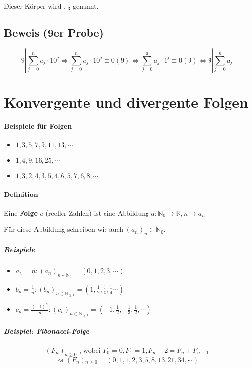 \documentclass[14pt,a4paper]{article}
\newcommand{\N}{\ensuremath{\mathbb{N}}}
\newcommand{\Nzero}{\ensuremath{\N_0}}
\begin{document}
  Dieser Körper wird $\mathbb{F}_3$ genannt.

  \subsection{Beweis (9er Probe)}
  $$ 9 | \sum_{j=0}^n a_j \cdot 10^j \Leftrightarrow \sum_{j=0}^n a_j \cdot
  10^j \equiv 0 (9) \Leftrightarrow \sum_{j=0}^n a_j \cdot 1^j \equiv 0 (9)
  \Leftrightarrow 9 | \sum_{j=0}^n a_j  $$

  \section{Konvergente und divergente Folgen}
  \paragraph{Beispiele für Folgen}
  \begin{itemize}
    \item $1,3,5,7,9,11,13, \dotsb$
    \item $1,4,9,16,25, \dotsb$
    \item $1,3,2,4,3,5,4,6,5,7,6,8, \dotsb$
  \end{itemize}

  \paragraph{Definition}
  Eine \textbf{Folge} $a$ (reeller Zahlen) ist eine Abbildung $ a : \Nzero
  \to \mathbb{R}, n \mapsto a_n $

  Für diese Abbildung schreiben wir auch $ (a_n)_n \in \Nzero$.


  \subparagraph{Beispiele}
  \begin{itemize}
    \item $a_n = n :  (a_n)_{n \in \Nzero}=(0,1,2,3,\dotsb)$
    \item $b_n = \frac{1}{n} : (b_n)_{n\in \N_{\geq 1}} = (1, \frac{1}{2},
        \frac{1}{3}, \frac{1}{4} \dotsb ) $
    \item $c_n = \frac{(-1)^n}{n} : (c_n)_{n \in \N_{\geq 1}} = (-1,
      \frac{1}{2}, -\frac{1}{3}, \frac{1}{2}, \dotsb)$
    \end{itemize}

    \subparagraph{Beispiel: Fibonacci-Folge}
    $$ (F_n)_{n \geq 0} \text{ , wobei } F_0=0, F_1=1, F_n+2 = F_n + F_{n+1} $$
    $$ \rightsquigarrow (F_n){_{n \geq 0}} = (0, 1, 1, 2, 3, 5, 8, 13, 21, 34,
    \dotsb)$$
\end{document}
